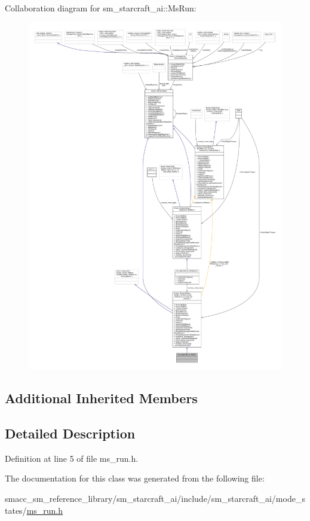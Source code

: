 Collaboration diagram for sm\+\_\+starcraft\+\_\+ai\+:\+:Ms\+Run\+:
\nopagebreak
\begin{figure}[H]
\begin{center}
\leavevmode
\includegraphics[width=350pt]{classsm__starcraft__ai_1_1MsRun__coll__graph}
\end{center}
\end{figure}
\subsection*{Additional Inherited Members}


\subsection{Detailed Description}


Definition at line 5 of file ms\+\_\+run.\+h.



The documentation for this class was generated from the following file\+:\begin{DoxyCompactItemize}
\item 
smacc\+\_\+sm\+\_\+reference\+\_\+library/sm\+\_\+starcraft\+\_\+ai/include/sm\+\_\+starcraft\+\_\+ai/mode\+\_\+states/\hyperlink{sm__starcraft__ai_2include_2sm__starcraft__ai_2mode__states_2ms__run_8h}{ms\+\_\+run.\+h}\end{DoxyCompactItemize}
